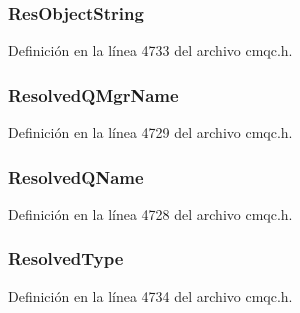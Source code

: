 \subsubsection[{Res\+Object\+String}]{ Res\+Object\+String}\label{structtag_m_q_o_d_a8f35fe6f52369753de1259a9468437eb}


Definición en la línea 4733 del archivo cmqc.\+h.

\hypertarget{structtag_m_q_o_d_af36c1b6e6f3f92e0c733c43da9fada3f}{}
\subsubsection[{Resolved\+Q\+Mgr\+Name}]{ Resolved\+Q\+Mgr\+Name}\label{structtag_m_q_o_d_af36c1b6e6f3f92e0c733c43da9fada3f}


Definición en la línea 4729 del archivo cmqc.\+h.

\hypertarget{structtag_m_q_o_d_aec4a06d696b4370f0c86b129d9f868ca}{}
\subsubsection[{Resolved\+Q\+Name}]{ Resolved\+Q\+Name}\label{structtag_m_q_o_d_aec4a06d696b4370f0c86b129d9f868ca}


Definición en la línea 4728 del archivo cmqc.\+h.

\hypertarget{structtag_m_q_o_d_ab1523b449e77139034581b4e5f7c4201}{}
\subsubsection[{Resolved\+Type}]{ Resolved\+Type}\label{structtag_m_q_o_d_ab1523b449e77139034581b4e5f7c4201}


Definición en la línea 4734 del archivo cmqc.\+h.

\hypertarget{structtag_m_q_o_d_a944cab1325e5696fccf9202988c81066}{}
